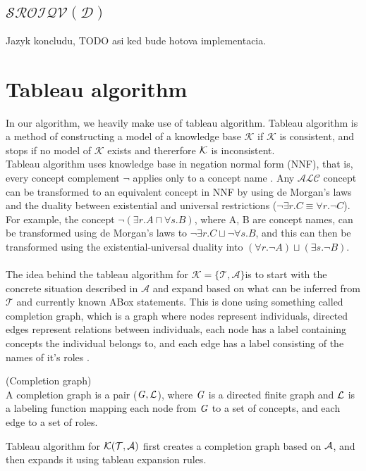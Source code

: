 \subsection{$\mathcal{SROIQV(D)}$}
Jazyk koncludu, TODO asi ked bude hotova implementacia.
\section{Tableau algorithm}

In our algorithm, we heavily make use of tableau algorithm.
Tableau algorithm is a method of constructing a model of a knowledge base $\mathcal{K}$ if $\mathcal{K}$ is consistent, and stops if no model of $\mathcal{K}$ exists and thererfore $\mathcal{K}$ is inconsistent. \\ \indent
Tableau algorithm uses knowledge base in negation normal form (NNF), that is, every concept complement $\neg$ applies only to a concept name \cite{handbook2}.  Any $\mathcal{ALC}$ concept can be transformed to an equivalent concept in NNF by using de Morgan's laws and the duality between existential and universal restrictions ($\neg \exists r.C \equiv \forall r.{\neg C}$).
For example, the concept $\neg (\exists r.A \sqcap \forall s.B)$,
where A, B are concept names, can be transformed using de Morgan's laws to $\neg \exists r.C \sqcup \neg \forall s.B$, and this can then be transformed using the existential-universal duality into $(\forall r.\neg A) \sqcup (\exists s.\neg B)$.
\\ \\ 
\indent The idea behind the tableau algorithm for $\mathcal{K} = \{ \mathcal{T} , \mathcal{A} \} $is to start with the concrete situation described in $\mathcal{A}$ and expand based on what can be inferred from $\mathcal{T}$ and currently known ABox statements. This is done using something called completion graph, which is a graph where nodes represent individuals, directed edges represent relations between individuals, each node has a label containing concepts the individual belongs to, and each edge has a label consisting of the names of it's roles .

\begin{mydef} (Completion graph) \\
A completion graph is a pair ($\mathit{G},\mathcal{L}$), where $\mathit{G}$ is a directed finite graph and $\mathcal{L}$ is a labeling function mapping each node from $\mathit{G}$ to a set of concepts, and each edge to a set of roles. 
\end{mydef}


Tableau algorithm for $\mathcal{K} (\mathcal{T} ,\mathcal{A} )$ first creates a completion graph based on $\mathcal{A}$, and then expands it using tableau expansion rules.


